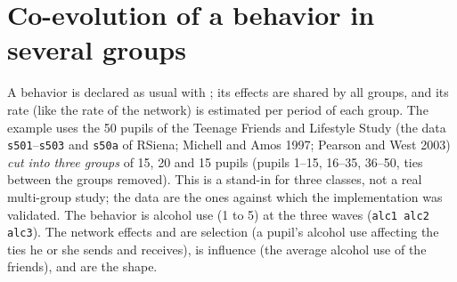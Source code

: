 \section{Co-evolution of a behavior in several groups}\label{sec:groups-coev}

A behavior is declared as usual with ; its effects are shared by all groups, and its rate (like the rate of the network) is estimated per period of each group. The example uses the 50 pupils of the Teenage Friends and Lifestyle Study (the data \texttt{s501}--\texttt{s503} and \texttt{s50a} of RSiena; Michell and Amos 1997; Pearson and West 2003) \emph{cut into three groups} of 15, 20 and 15 pupils (pupils 1--15, 16--35, 36--50, ties between the groups removed). This is a stand-in for three classes, not a real multi-group study; the data are the ones against which the implementation was validated. The behavior is alcohol use (1 to 5) at the three waves (\texttt{alc1 alc2 alc3}). The network effects  and  are selection (a pupil's alcohol use affecting the ties he or she sends and receives),  is influence (the average alcohol use of the friends),  and  are the shape.
